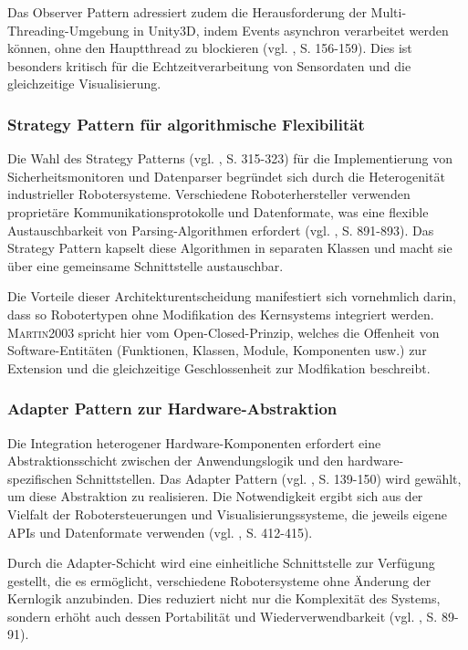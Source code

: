 Das Observer Pattern adressiert zudem die Herausforderung der
Multi-Threading-Umgebung in Unity3D, indem Events asynchron verarbeitet werden
können, ohne den Hauptthread zu blockieren (vgl. , S.
156-159). Dies ist besonders kritisch für die Echtzeitverarbeitung von
Sensordaten und die gleichzeitige Visualisierung.

\subsubsection{Strategy Pattern für algorithmische Flexibilität}
Die Wahl des Strategy Patterns (vgl. , S. 315-323) für die
Implementierung von Sicherheitsmonitoren und Datenparser begründet sich durch
die Heterogenität industrieller Robotersysteme. Verschiedene Roboterhersteller
verwenden proprietäre Kommunikationsprotokolle und Datenformate, was eine
flexible Austauschbarkeit von Parsing-Algorithmen erfordert (vgl.
, S. 891-893). Das Strategy Pattern kapselt diese
Algorithmen in separaten Klassen und macht sie über eine gemeinsame
Schnittstelle austauschbar.

Die Vorteile dieser Architekturentscheidung manifestiert sich vornehmlich
darin, dass so Robotertypen ohne Modifikation des Kernsystems integriert
werden. \textsc{Martin2003} spricht hier vom Open-Closed-Prinzip, welches die
Offenheit von Software-Entitäten (Funktionen, Klassen, Module, Komponenten
usw.) zur Extension und die gleichzeitige Geschlossenheit zur Modfikation
beschreibt.

\subsubsection{Adapter Pattern zur Hardware-Abstraktion}
Die Integration heterogener Hardware-Komponenten erfordert eine
Abstraktionsschicht zwischen der Anwendungslogik und den hardware-spezifischen
Schnittstellen. Das Adapter Pattern (vgl. , S. 139-150) wird
gewählt, um diese Abstraktion zu realisieren. Die Notwendigkeit ergibt sich aus
der Vielfalt der Robotersteuerungen und Visualisierungssysteme, die jeweils
eigene APIs und Datenformate verwenden (vgl. , S. 412-415).

Durch die Adapter-Schicht wird eine einheitliche Schnittstelle zur Verfügung
gestellt, die es ermöglicht, verschiedene Robotersysteme ohne Änderung der
Kernlogik anzubinden. Dies reduziert nicht nur die Komplexität des Systems,
sondern erhöht auch dessen Portabilität und Wiederverwendbarkeit (vgl.
, S. 89-91).

